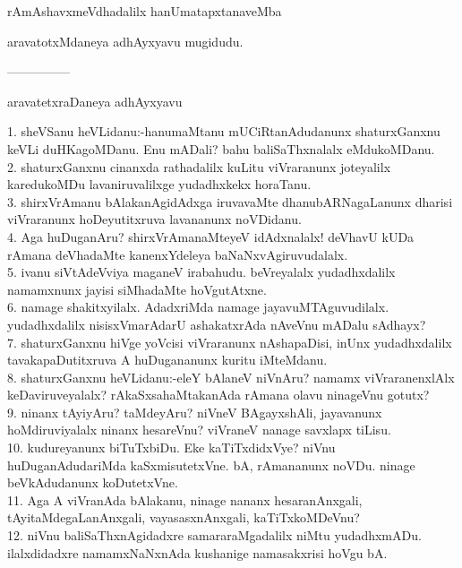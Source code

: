 \documentclass{article}
\begin{document}
\begin{center}
rAmAshavxmeVdhadalilx hanUmatapxtanaveMba
\end{center}

\begin{center}
aravatotxMdaneya adhAyxyavu mugidudu.
\end{center}

\begin{center}
---------------
\end{center}

\begin{center}
aravatetxraDaneya adhAyxyavu
\end{center}

1. sheVSanu heVLidanu:-hanumaMtanu mUCiRtanAdudanunx shaturxGanxnu keVLi duHKagoMDanu. Enu mADali? bahu baliSaThxnalalx eMdukoMDanu.\\
2. shaturxGanxnu cinanxda rathadalilx kuLitu viVraranunx joteyalilx karedukoMDu lavaniruvalilxge yudadhxkekx horaTanu.\\
3. shirxVrAmanu bAlakanAgidAdxga iruvavaMte dhanubARNagaLanunx dharisi viVraranunx hoDeyutitxruva lavananunx noVDidanu.\\
4. Aga huDuganAru? shirxVrAmanaMteyeV idAdxnalalx! deVhavU kUDa rAmana deVhadaMte kanenxYdeleya baNaNxvAgiruvudalalx.\\
5. ivanu siVtAdeVviya maganeV irabahudu. beVreyalalx yudadhxdalilx namamxnunx jayisi siMhadaMte hoVgutAtxne.\\
6. namage shakitxyilalx. AdadxriMda namage jayavuMTAguvudilalx. yudadhxdalilx nisisxVmarAdarU ashakatxrAda nAveVnu mADalu sAdhayx?\\
7. shaturxGanxnu hiVge yoVcisi viVraranunx nAshapaDisi, inUnx yudadhxdalilx tavakapaDutitxruva A huDugananunx kuritu iMteMdanu.\\
8. shaturxGanxnu heVLidanu:-eleY bAlaneV niVnAru? namamx viVraranenxlAlx keDaviruveyalalx? rAkaSxsahaMtakanAda rAmana olavu ninageVnu gotutx?\\
9. ninanx tAyiyAru? taMdeyAru? niVneV BAgayxshAli, jayavanunx hoMdiruviyalalx ninanx hesareVnu? viVraneV nanage savxlapx tiLisu.\\
10. kudureyanunx biTuTxbiDu. Eke kaTiTxdidxVye? niVnu huDuganAdudariMda kaSxmisutetxVne. bA, rAmananunx noVDu. ninage beVkAdudanunx koDutetxVne.\\
11. Aga A viVranAda bAlakanu, ninage nananx hesaranAnxgali, tAyitaMdegaLanAnxgali, vayasasxnAnxgali, kaTiTxkoMDeVnu?\\
12. niVnu baliSaThxnAgidadxre samararaMgadalilx niMtu yudadhxmADu. ilalxdidadxre namamxNaNxnAda kushanige namasakxrisi hoVgu bA.\\
\end{document}
